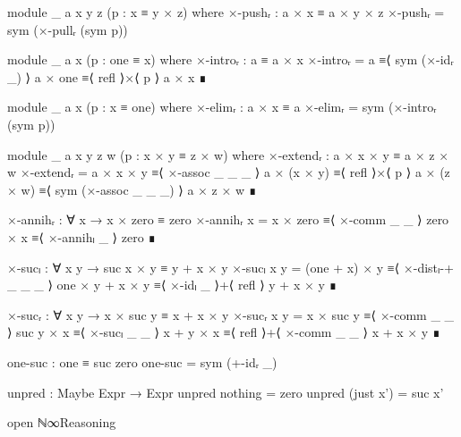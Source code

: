 \begin{code}[hide]
    module _ {a x y z} (p : x ≡ y × z) where
      ×-pushᵣ : a × x ≡ a × y × z
      ×-pushᵣ = sym (×-pullᵣ (sym p))

    module _ {a x} (p : one ≡ x) where
      ×-introᵣ : a ≡ a × x
      ×-introᵣ =
        a       ≡⟨ sym (×-idᵣ _) ⟩
        a × one ≡⟨ refl ⟩×⟨ p ⟩
        a × x   ∎

    module _ {a x} (p : x ≡ one) where
      ×-elimᵣ : a × x ≡ a
      ×-elimᵣ = sym (×-introᵣ (sym p))

    module _ {a x y z w} (p : x × y ≡ z × w) where
      ×-extendᵣ : a × x × y ≡ a × z × w
      ×-extendᵣ =
        a × x × y   ≡⟨ ×-assoc _ _ _ ⟩
        a × (x × y) ≡⟨ refl ⟩×⟨ p ⟩
        a × (z × w) ≡⟨ sym (×-assoc _ _ _) ⟩
        a × z × w   ∎

    ×-annihᵣ : ∀ x → x × zero ≡ zero
    ×-annihᵣ x =
      x × zero ≡⟨ ×-comm _ _ ⟩
      zero × x ≡⟨ ×-annihₗ _ ⟩
      zero     ∎

    ×-sucₗ : ∀ x y → suc x × y ≡ y + x × y
    ×-sucₗ x y =
      (one + x) × y   ≡⟨ ×-distₗ-+ _ _ _ ⟩
      one × y + x × y ≡⟨ ×-idₗ _ ⟩+⟨ refl ⟩
      y + x × y       ∎

    ×-sucᵣ : ∀ x y → x × suc y ≡ x + x × y
    ×-sucᵣ x y =
      x × suc y ≡⟨ ×-comm _ _ ⟩
      suc y × x ≡⟨ ×-sucₗ _ _ ⟩
      x + y × x ≡⟨ refl ⟩+⟨ ×-comm _ _ ⟩
      x + x × y ∎

    one-suc : one ≡ suc zero
    one-suc = sym (+-idᵣ _)

    unpred : Maybe Expr → Expr
    unpred nothing = zero
    unpred (just x') = suc x'

  open ℕ∞Reasoning
\end{code}

